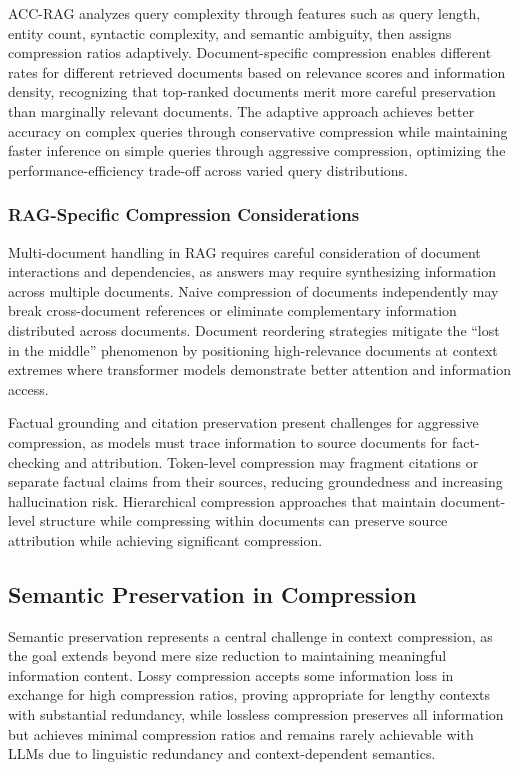 \documentclass[11pt,letterpaper]{article}
\begin{document}
ACC-RAG analyzes query complexity through features such as query length, entity count, syntactic complexity, and semantic ambiguity, then assigns compression ratios adaptively. Document-specific compression enables different rates for different retrieved documents based on relevance scores and information density, recognizing that top-ranked documents merit more careful preservation than marginally relevant documents. The adaptive approach achieves better accuracy on complex queries through conservative compression while maintaining faster inference on simple queries through aggressive compression, optimizing the performance-efficiency trade-off across varied query distributions.

\subsubsection{RAG-Specific Compression Considerations}

Multi-document handling in RAG requires careful consideration of document interactions and dependencies, as answers may require synthesizing information across multiple documents. Naive compression of documents independently may break cross-document references or eliminate complementary information distributed across documents. Document reordering strategies mitigate the ``lost in the middle'' phenomenon by positioning high-relevance documents at context extremes where transformer models demonstrate better attention and information access.

Factual grounding and citation preservation present challenges for aggressive compression, as models must trace information to source documents for fact-checking and attribution. Token-level compression may fragment citations or separate factual claims from their sources, reducing groundedness and increasing hallucination risk. Hierarchical compression approaches that maintain document-level structure while compressing within documents can preserve source attribution while achieving significant compression.

\subsection{Semantic Preservation in Compression}

Semantic preservation represents a central challenge in context compression, as the goal extends beyond mere size reduction to maintaining meaningful information content. Lossy compression accepts some information loss in exchange for high compression ratios, proving appropriate for lengthy contexts with substantial redundancy, while lossless compression preserves all information but achieves minimal compression ratios and remains rarely achievable with LLMs due to linguistic redundancy and context-dependent semantics.
\end{document}
